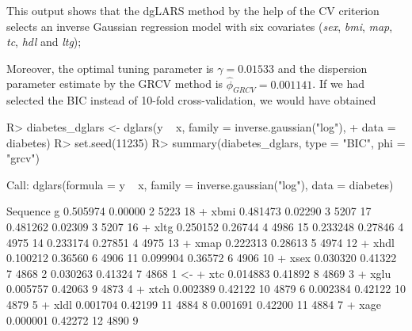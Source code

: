 This output shows that the dgLARS method by the help of the CV criterion selects an inverse Gaussian regression model with six covariates (\textit{sex}, \textit{bmi}, \textit{map}, \textit{tc}, \textit{hdl} and \textit{ltg});

Moreover, the optimal tuning parameter is $$ and the dispersion parameter estimate by the GRCV method is $\hat{\phi}_{GRCV}=0.001141$. If we had selected the BIC instead of 10-fold cross-validation, we would have obtained

\begin{example}
R> diabetes_dglars <- dglars(y ~ x, family = inverse.gaussian("log"),
+                            data = diabetes)
R> set.seed(11235)
R> summary(diabetes_dglars, type = "BIC", phi = "grcv")

Call:  dglars(formula = y ~ x, family = inverse.gaussian("log"), data = diabetes)

  Sequence         g     %
            0.505974  0.00000   2  5223  18   
   + xbmi                                     
            0.481473  0.02290   3  5207  17   
            0.481262  0.02309   3  5207  16   
   + xltg                                     
            0.250152  0.26744   4  4986  15   
            0.233248  0.27846   4  4975  14   
            0.233174  0.27851   4  4975  13   
   + xmap                                     
            0.222313  0.28613   5  4974  12   
   + xhdl                                     
            0.100212  0.36560   6  4906  11   
            0.099904  0.36572   6  4906  10   
   + xsex                                     
            0.030320  0.41322   7  4868   2   
            0.030263  0.41324   7  4868   1 <-
    + xtc                                     
            0.014883  0.41892   8  4869   3   
   + xglu                                     
            0.005757  0.42063   9  4873   4   
   + xtch                                     
            0.002389  0.42122  10  4879   6   
            0.002384  0.42122  10  4879   5   
   + xldl                                     
            0.001704  0.42199  11  4884   8   
            0.001691  0.42200  11  4884   7   
   + xage                                     
            0.000001  0.42272  12  4890   9   


\end{example}
